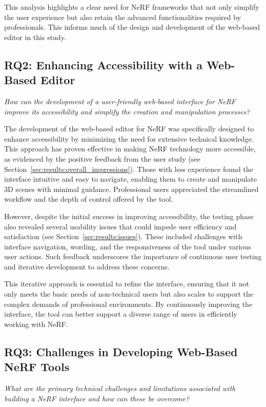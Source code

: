 This analysis highlights a clear need for NeRF frameworks that not only simplify the user experience but also retain the advanced functionalities required by professionals. 
This informs much of the design and development of the web-based editor in this study.

\subsection*{RQ2: Enhancing Accessibility with a Web-Based Editor}

\emph{How can the development of a user-friendly web-based interface for NeRF improve its accessibility and simplify the creation and manipulation processes?}

The development of the web-based editor for NeRF was specifically designed to enhance accessibility by minimizing the need for extensive technical knowledge.
This approach has proven effective in making NeRF technology more accessible, as evidenced by the positive feedback from the user study (see Section~\ref{sec:results:overall_impressions}).
Those with less experience found the interface intuitive and easy to navigate, enabling them to create and manipulate 3D scenes with minimal guidance.
Professional users appreciated the streamlined workflow and the depth of control offered by the tool.

However, despite the initial success in improving accessibility, the testing phase also revealed several usability issues that could impede user efficiency and satisfaction (see Section~\ref{sec:results:issues}).
These included challenges with interface navigation, wording, and the responsiveness of the tool under various user actions.
Such feedback underscores the importance of continuous user testing and iterative development to address these concerns.

This iterative approach is essential to refine the interface, ensuring that it not only meets the basic needs of non-technical users but also scales to support the complex demands of professional environments.
By continuously improving the interface, the tool can better support a diverse range of users in efficiently working with NeRF.

\subsection*{RQ3: Challenges in Developing Web-Based NeRF Tools}
\emph{What are the primary technical challenges and limitations associated with building a NeRF interface and how can these be overcome?}

